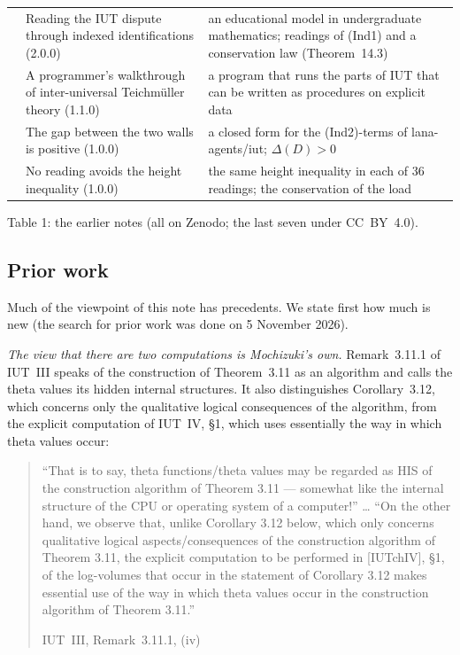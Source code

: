 \documentclass[11pt,a4paper]{article}
\newcommand{\lab}[2]{{\upshape\fcolorbox{#1}{#1!8}{\scriptsize\sffamily\bfseries\textcolor{#1}{#2}}}}
\newcommand{\tagS}{\lab{blue}{S}}
\newcommand{\q}[1]{``#1''}
\newcommand{\srcquote}[2]{\begin{quote}\small #1\par\nopagebreak\hfill{\footnotesize #2}\end{quote}}
\begin{document}
\begin{center}
\begin{tabularx}{\textwidth}{@{}l>{\raggedright}p{6.3cm}X@{}}
\cite{II} & Reading the IUT dispute through indexed identifications (2.0.0) & an educational model in undergraduate
mathematics; readings of (Ind1) and a conservation law (Theorem~14.3)\\
\cite{WT} & A programmer's walkthrough of inter-universal Teichm\"uller theory (1.1.0) & a program that runs the parts of
IUT that can be written as procedures on explicit data\\
\cite{Gap} & The gap between the two walls is positive (1.0.0) & a closed form for the (Ind2)-terms of lana-agents/iut;
$\Delta(D)>0$\\
\cite{RF} & No reading avoids the height inequality (1.0.0) & the same height inequality in each of 36 readings; the
conservation of the load\\
\bottomrule
\end{tabularx}

\smallskip Table 1: the earlier notes (all on Zenodo; the last seven under CC~BY~4.0).
\end{center}

\subsection{Prior work}
Much of the viewpoint of this note has precedents. We state first how much is new (the search for prior work was
done on 5 November 2026).

\tagS{} \emph{The view that there are two computations is Mochizuki's own.} Remark~3.11.1 of IUT~III speaks of the
construction of Theorem~3.11 as an algorithm and calls the theta values its hidden internal structures. It also
distinguishes Corollary~3.12, which concerns only the qualitative logical consequences of the algorithm, from the
explicit computation of IUT~IV, \S1, which uses essentially the way in which theta values occur:
\srcquote{\q{That is to say, theta functions/theta values may be regarded as HIS of the construction algorithm of
Theorem 3.11 --- somewhat like the internal structure of the CPU or operating system of a computer!} \dots{}
\q{On the other hand, we observe that, unlike Corollary 3.12 below, which only concerns qualitative logical
aspects/consequences of the construction algorithm of Theorem 3.11, the explicit computation to be performed in
[IUTchIV], \S1, of the log-volumes that occur in the statement of Corollary 3.12 makes essential use of the way in
which theta values occur in the construction algorithm of Theorem 3.11.}}{IUT~III, Remark~3.11.1, (iv)
\cite{IUT3}}
\end{document}

